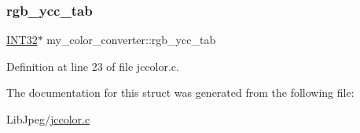 \mbox{\label{structmy__color__converter_a783865e631ba6e4e903fcfad6625ec2f}} 
\subsubsection{\texorpdfstring{rgb\_ycc\_tab}{rgb\_ycc\_tab}}
{\footnotesize\ttfamily \mbox{\hyperlink{jmorecfg_8h_a0cb58e7e6f0bad369840a52e54a56ae0}{I\+N\+T32}}$\ast$ my\+\_\+color\+\_\+converter\+::rgb\+\_\+ycc\+\_\+tab}



Definition at line 23 of file jccolor.\+c.



The documentation for this struct was generated from the following file\+:\begin{DoxyCompactItemize}
\item 
Lib\+Jpeg/\mbox{\hyperlink{jccolor_8c}{jccolor.\+c}}\end{DoxyCompactItemize}
